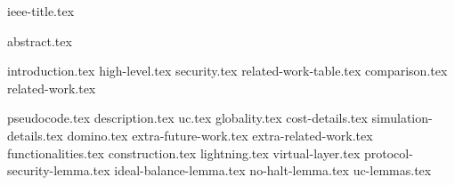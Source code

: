 \documentclass[conference,compsoc]{IEEEtran}
\begin{document}
{ieee-title.tex}
\maketitle
\thispagestyle{firstpagestyle}
{abstract.tex}

{introduction.tex}
{high-level.tex}
%
{security.tex}
{related-work-table.tex}
{comparison.tex}
{related-work.tex}
%

\makeatletter%
%
  {\appendices}%
  {\appendix}%
\makeatother%
{pseudocode.tex}
%
{description.tex}
{uc.tex}
{globality.tex}
{cost-details.tex}
{simulation-details.tex}
{domino.tex}
{extra-future-work.tex}
%
{extra-related-work.tex}
{functionalities.tex}
{construction.tex}
{lightning.tex}
{virtual-layer.tex}
{protocol-security-lemma.tex}
{ideal-balance-lemma.tex}
{no-halt-lemma.tex}
{uc-lemmas.tex}
\end{document}
